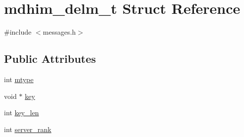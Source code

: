 \hypertarget{structmdhim__delm__t}{\section{mdhim\-\_\-delm\-\_\-t Struct Reference}
\label{d7/da5/structmdhim__delm__t}
}


{\ttfamily \#include $<$messages.\-h$>$}

\subsection*{Public Attributes}
\begin{DoxyCompactItemize}
\item 
int \hyperlink{structmdhim__delm__t_aed97225c8df041600c6b5fffb43a1bbc}{mtype}
\item 
void $\ast$ \hyperlink{structmdhim__delm__t_acedac9daad7ab8b9870f8c7c2a471ced}{key}
\item 
int \hyperlink{structmdhim__delm__t_aed818ed56728fe40acd3567fce5a2fb5}{key\-\_\-len}
\item 
int \hyperlink{structmdhim__delm__t_a00480044a106cf24c63e03b3d15320dc}{server\-\_\-rank}
\end{DoxyCompactItemize}


